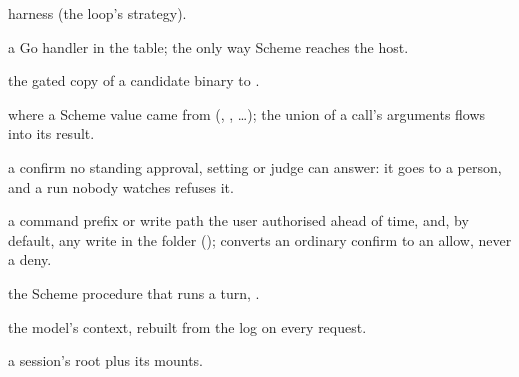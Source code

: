 \begin{description}[leftmargin=2.2em]
  harness (the loop's strategy).
\item[primitive] a Go handler in the table; the only way Scheme reaches the
  host.
\item[promotion] the gated copy of a candidate binary to .
\item[provenance tag] where a Scheme value came from (,
  , \ldots); the union of a call's arguments flows into
  its result.
\item[security confirm] a confirm no standing approval, \code{[approval]}
  setting or judge can answer: it goes to a person, and a run nobody
  watches refuses it.
\item[standing approval] a command prefix or write path the user authorised
  ahead of time, and, by default, any write in the folder
  (); converts an ordinary confirm to an allow, never
  a deny.
\item[strategy] the Scheme procedure that runs a turn, .
\item[window] the model's context, rebuilt from the log on every request.
\item[workspace] a session's root plus its mounts.
\end{description}

